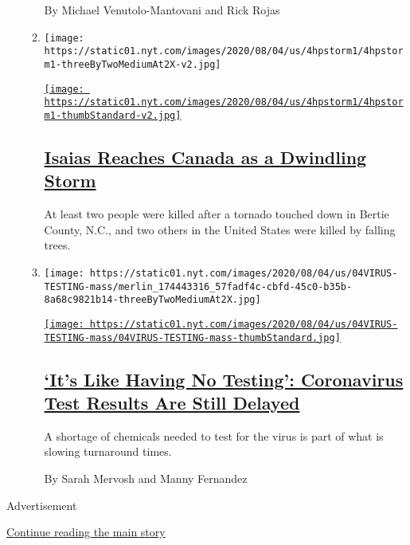 \begin{enumerate}
\begin{enumerate}
    By Michael Venutolo-Mantovani and Rick Rojas
  \item
    \texttt{[image: https://static01.nyt.com/images/2020/08/04/us/4hpstorm1/4hpstorm1-threeByTwoMediumAt2X-v2.jpg]}

    \href{/2020/08/04/us/isaias-storm-updates.html}{\texttt{[image: https://static01.nyt.com/images/2020/08/04/us/4hpstorm1/4hpstorm1-thumbStandard-v2.jpg]}}

    \hypertarget{isaias-reaches-canada-as-a-dwindling-storm}{%
    \subsection{\texorpdfstring{\href{/2020/08/04/us/isaias-storm-updates.html}{Isaias
    Reaches Canada as a Dwindling
    Storm}}{Isaias Reaches Canada as a Dwindling Storm}}\label{isaias-reaches-canada-as-a-dwindling-storm}}

    At least two people were killed after a tornado touched down in
    Bertie County, N.C., and two others in the United States were killed
    by falling trees.
  \item
    \texttt{[image: https://static01.nyt.com/images/2020/08/04/us/04VIRUS-TESTING-mass/merlin\_174443316\_57fadf4c-cbfd-45c0-b35b-8a68c9821b14-threeByTwoMediumAt2X.jpg]}

    \href{/2020/08/04/us/virus-testing-delays.html}{\texttt{[image: https://static01.nyt.com/images/2020/08/04/us/04VIRUS-TESTING-mass/04VIRUS-TESTING-mass-thumbStandard.jpg]}}

    \hypertarget{its-like-having-no-testing-coronavirus-test-results-are-still-delayed}{%
    \subsection{\texorpdfstring{\href{/2020/08/04/us/virus-testing-delays.html}{`It's
    Like Having No Testing': Coronavirus Test Results Are Still
    Delayed}}{`It's Like Having No Testing': Coronavirus Test Results Are Still Delayed}}\label{its-like-having-no-testing-coronavirus-test-results-are-still-delayed}}

    A shortage of chemicals needed to test for the virus is part of what
    is slowing turnaround times.

    By Sarah Mervosh and Manny Fernandez
  \end{enumerate}
\end{enumerate}

Advertisement

\protect\hyperlink{after-mid1}{Continue reading the main story}

